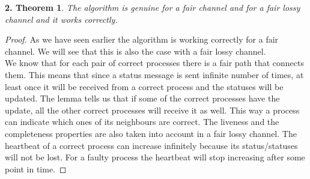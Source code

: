 \documentclass[12pt]{article}
\theoremstyle{plain}
\begin{document}
\newtheorem*{th2}{2. Theorem}
\begin{th2}
  The algorithm is genuine for a fair channel and for a fair lossy channel and
  it works correctly.
\end{th2}
\begin{proof}[Proof]
  As we have seen earlier the algorithm is working correctly for a fair channel.
  We will see that this is also the case with a fair lossy channel. \\
  We know that for each pair of correct processes there is a fair path that
  connects them. This means that since a status message is sent infinite
  number of times, at least once it will be received from a correct process and
  the statuses will be updated. The lemma tells us that if some of the correct
  processes have the update, all the other correct processes will receive it 
  as well. This way a process can indicate which ones of its neighbours are
  correct. The liveness and the completeness properties are also taken into
  account in a fair lossy channel. The heartbeat of a correct process can
  increase infinitely because its status/statuses will not be lost.  For a
  faulty process the heartbeat will stop increasing after some point in time.
\end{proof}
\end{document}
